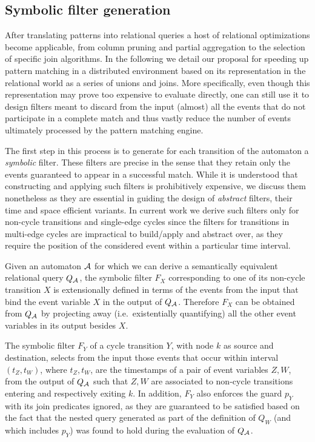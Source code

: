 \subsection{Symbolic filter generation}
\label{sec:prec_filter_generation}



After translating patterns into relational queries a host of relational 
optimizations become applicable, from column pruning and partial aggregation to
the selection of specific join algorithms.
In the following we detail our proposal for speeding up pattern matching in a 
distributed environment based on its representation in the relational world as 
a series of unions and joins.
More specifically, even though this representation may prove too expensive to 
evaluate directly, one can still use it to design filters meant to discard from 
the input (almost) all the events that do not participate in a complete match 
and thus vastly reduce the number of events ultimately processed by the pattern 
matching engine.
 


The first step in this process is to generate for each transition of the 
automaton a {\em symbolic} filter.
These filters are precise in the sense that they retain only the events  
guaranteed to appear in a successful match.
While it is understood that constructing and applying such filters is 
prohibitively expensive, we discuss them nonetheless as they are essential in 
guiding the design of {\em abstract} filters, their time and space efficient 
variants. 
In current work we derive such filters only for non-cycle transitions and 
single-edge cycles since the filters for transitions in multi-edge cycles 
are impractical to build/apply and abstract over, as they require the position 
of the considered event within a particular time interval.



Given an automaton $\mathcal{A}$ for which we can derive a semantically equivalent  
relational query $Q_{\mathcal{A}}$, the symbolic filter $F_X$ corresponding to one of 
its non-cycle transition $X$ is extensionally defined in terms of the events 
from the input that bind the event variable $X$ in the output of $Q_{\mathcal{A}}$. 
Therefore $F_X$ can be obtained from $Q_{\mathcal{A}}$ by projecting away (i.e.\ 
existentially quantifying) all the other event variables in its output besides 
$X$.

The symbolic filter $F_Y$ of a cycle transition $Y$, with node $k$ as source 
and destination, selects from the input those events that occur within interval 
$(t_Z, t_W)$, where $t_Z, t_W$, are the timestamps of a pair of event variables 
$Z, W$, from the output of $Q_{\mathcal{A}}$ such that $Z, W$ are associated to 
non-cycle transitions entering and respectively exiting $k$.
In addition, $F_Y$ also enforces the guard $p_Y$ with its join predicates 
ignored, as they are guaranteed to be satisfied based on the fact that the 
nested query generated as part of the definition of $Q_W$ (and which includes 
$p_Y$) was found to hold during the evaluation of $Q_{\mathcal{A}}$.
 

